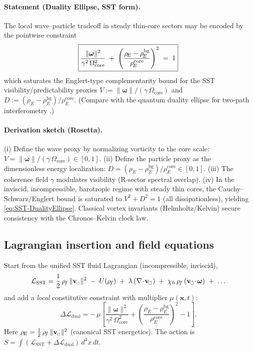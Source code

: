 \documentclass[10pt,reprint,aps,onecolumn,nofootinbib]{revtex4-2}
\newcommand{\vswirl}{\mathbf{v}_{\!\boldsymbol{\circlearrowleft}}}
\newcommand{\vnorm}{\lVert \mathbf{v}_{\mkern-2mu\scriptscriptstyle\boldsymbol{\circlearrowleft}} \rVert}               %
\newcommand{\rhoF}{\rho_{\!f}}
\newcommand{\rhoE}{\rho_{\!E}}                           %
\newcommand{\omegaVec}{\boldsymbol{\omega}}
\newcommand{\OmegaCore}{\Omega_{\mathrm{core}}}
\newcommand{\bg}{\mathrm{bg}}
\newcommand{\core}{\mathrm{core}}
\begin{document}
\paragraph{Statement (Duality Ellipse, SST form).}
    The local wave–particle tradeoff in steady thin-core sectors may be encoded by the pointwise constraint
    \begin{equation}
        \boxed{%
            \frac{\lVert\omegaVec\rVert^{2}}{\gamma^{2}\,\OmegaCore^{2}}
            \;+\;
            \left(\frac{\rhoE-\rhoE^{\bg}}{\rhoE^{\core}}\right)^{2}
            \;=\;1
        }
        \label{eq:SST-DualityEllipse}
    \end{equation}
    which saturates the Englert-type complementarity bound for the SST visibility/predictability proxies
    $V:=\lVert\omegaVec\rVert/(\gamma\,\OmegaCore)$ and $D:=(\rhoE-\rhoE^{\bg})/\rhoE^{\core}$.
    (Compare with the quantum duality ellipse for two-path interferometry \cite{Englert1996,KhatiwadaQian2025}.)

\paragraph{Derivation sketch (Rosetta).}
(i) Define the wave proxy by normalizing vorticity to the core scale:
    $V=\lVert\omegaVec\rVert/(\gamma\,\OmegaCore)\in[0,1]$.
    (ii) Define the particle proxy as the dimensionless energy localization:
    $D=(\rhoE-\rhoE^{\bg})/\rhoE^{\core}\in[0,1]$.
    (iii) The coherence field $\gamma$ modulates visibility (R-sector spectral overlap).
    (iv) In the inviscid, incompressible, barotropic regime with steady thin cores, the Cauchy–Schwarz/Englert
    bound is saturated to $V^2+D^2=1$ (all dissipationless), yielding \eqref{eq:SST-DualityEllipse}.
    Classical vortex invariants (Helmholtz/Kelvin) secure consistency with the Chronos–Kelvin clock law.

\subsection{Lagrangian insertion and field equations}
\label{subsec:Lag-DE}

Start from the unified SST fluid Lagrangian (incompressible, inviscid),
\begin{equation}
    \mathcal L_{\text{SST}} =
    \frac12\,\rhoF\,\vnorm^{2}
    \;-\; U(\rhoF)
    \;+\;\lambda\,(\nabla\!\cdot\!\vswirl)
    \;+\;\chi_h\,\rhoF\,(\vswirl\!\cdot\!\omegaVec)
    \;+\;\ldots
\end{equation}
and add a \emph{local} constitutive constraint with multiplier $\mu(\mathbf x,t)$:
\begin{equation}
    \Delta\mathcal L_{\text{dual}}
    = -\,\mu\!\left[
                  \frac{\lVert\omegaVec\rVert^{2}}{\gamma^{2}\,\OmegaCore^{2}}
                  +
                  \left(\frac{\rhoE-\rhoE^{\bg}}{\rhoE^{\core}}\right)^{2}
                  -1
    \right].
    \label{eq:dual-constraint-term}
\end{equation}
Here $\rhoE=\tfrac12\,\rhoF\,\vnorm^{2}$ (canonical SST energetics).
The action is $S=\int (\mathcal L_{\text{SST}}+\Delta\mathcal L_{\text{dual}})\,d^3x\,dt$.
\end{document}
